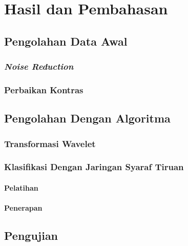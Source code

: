 \documentclass[laporan.tex]{subfiles}
\begin{document}
\chapter{Hasil dan Pembahasan}

\section{Pengolahan Data Awal}

\subsection{\emph{Noise Reduction}}

\subsection{Perbaikan Kontras}

\section{Pengolahan Dengan Algoritma}

\subsection{Transformasi Wavelet}

\subsection{Klasifikasi Dengan Jaringan Syaraf Tiruan}

\subsubsection{Pelatihan}

\subsubsection{Penerapan}

\section{Pengujian}
\end{document}
